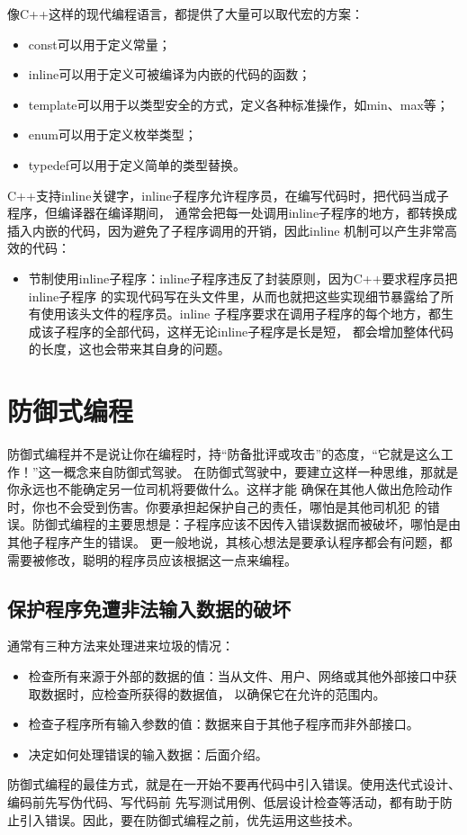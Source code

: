 \documentclass{article}
\begin{document}
\par
像C++这样的现代编程语言，都提供了大量可以取代宏的方案：
\begin{itemize}
    \item const可以用于定义常量；
    \item inline可以用于定义可被编译为内嵌的代码的函数；
    \item template可以用于以类型安全的方式，定义各种标准操作，如min、max等；
    \item enum可以用于定义枚举类型；
    \item typedef可以用于定义简单的类型替换。
\end{itemize}

\par
C++支持inline关键字，inline子程序允许程序员，在编写代码时，把代码当成子程序，但编译器在编译期间，
通常会把每一处调用inline子程序的地方，都转换成插入内嵌的代码，因为避免了子程序调用的开销，因此inline
机制可以产生非常高效的代码：
\begin{itemize}
    \item 节制使用inline子程序：inline子程序违反了封装原则，因为C++要求程序员把inline子程序
    的实现代码写在头文件里，从而也就把这些实现细节暴露给了所有使用该头文件的程序员。inline
    子程序要求在调用子程序的每个地方，都生成该子程序的全部代码，这样无论inline子程序是长是短，
    都会增加整体代码的长度，这也会带来其自身的问题。
\end{itemize}

\section{防御式编程}
防御式编程并不是说让你在编程时，持“防备批评或攻击”的态度，“它就是这么工作！”这一概念来自防御式驾驶。
在防御式驾驶中，要建立这样一种思维，那就是你永远也不能确定另一位司机将要做什么。这样才能
确保在其他人做出危险动作时，你也不会受到伤害。你要承担起保护自己的责任，哪怕是其他司机犯
的错误。防御式编程的主要思想是：子程序应该不因传入错误数据而被破坏，哪怕是由其他子程序产生的错误。
更一般地说，其核心想法是要承认程序都会有问题，都需要被修改，聪明的程序员应该根据这一点来编程。
\subsection{保护程序免遭非法输入数据的破坏}
通常有三种方法来处理进来垃圾的情况：
\begin{itemize}
    \item 检查所有来源于外部的数据的值：当从文件、用户、网络或其他外部接口中获取数据时，应检查所获得的数据值，
    以确保它在允许的范围内。
    \item 检查子程序所有输入参数的值：数据来自于其他子程序而非外部接口。
    \item 决定如何处理错误的输入数据：后面介绍。
\end{itemize}
防御式编程的最佳方式，就是在一开始不要再代码中引入错误。使用迭代式设计、编码前先写伪代码、写代码前
先写测试用例、低层设计检查等活动，都有助于防止引入错误。因此，要在防御式编程之前，优先运用这些技术。
\end{document}
